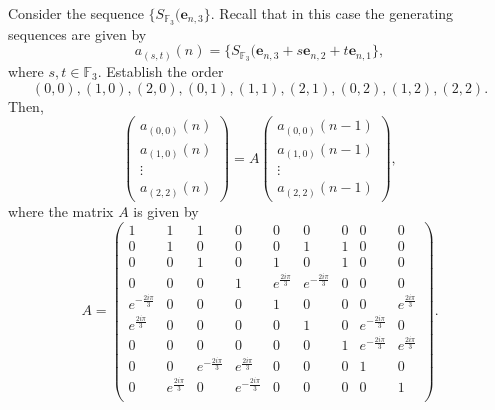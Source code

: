 \begin{example}
Consider the sequence $\{S_{\mathbb{F}_3}(\boldsymbol{e}_{n,3}\}$.  Recall that in this case the generating sequences are given by 
 \begin{equation}
  a_{(s,t)}(n)=\{S_{\mathbb{F}_3}(\boldsymbol{e}_{n,3}+s\boldsymbol{e}_{n,2}+t\boldsymbol{e}_{n,1}\},
 \end{equation}
 where $s,t\in \mathbb{F}_3$.  Establish the order
 $$(0,0), (1,0), (2,0), (0,1), (1,1), (2,1), (0,2),(1,2), (2,2).$$
 Then, 
 \begin{equation}
\left( \begin{array}{c}
  a_{(0,0)}(n)\\
  a_{(1,0)}(n)\\
  \vdots\\
  a_{(2,2)}(n)
 \end{array}
\right) = A \left( \begin{array}{c}
  a_{(0,0)}(n-1)\\
  a_{(1,0)}(n-1)\\
  \vdots\\
  a_{(2,2)}(n-1)
 \end{array}
\right),
\end{equation}
where the matrix $A$ is given by
\begin{equation}
 A=\left(
\begin{array}{ccccccccc}
 1 & 1 & 1 & 0 & 0 & 0 & 0 & 0 & 0 \\
 0 & 1 & 0 & 0 & 0 & 1 & 1 & 0 & 0 \\
 0 & 0 & 1 & 0 & 1 & 0 & 1 & 0 & 0 \\
 0 & 0 & 0 & 1 & e^{\frac{2 i \pi }{3}} & e^{-\frac{2 i \pi }{3}} & 0 & 0 & 0 \\
 e^{-\frac{2 i \pi }{3}} & 0 & 0 & 0 & 1 & 0 & 0 & 0 & e^{\frac{2 i \pi }{3}} \\
 e^{\frac{2 i \pi }{3}} & 0 & 0 & 0 & 0 & 1 & 0 & e^{-\frac{2 i \pi }{3}} & 0 \\
 0 & 0 & 0 & 0 & 0 & 0 & 1 & e^{-\frac{2 i \pi }{3}} & e^{\frac{2 i \pi }{3}} \\
 0 & 0 & e^{-\frac{2 i \pi }{3}} & e^{\frac{2 i \pi }{3}} & 0 & 0 & 0 & 1 & 0 \\
 0 & e^{\frac{2 i \pi }{3}} & 0 & e^{-\frac{2 i \pi }{3}} & 0 & 0 & 0 & 0 & 1 \\
\end{array}
\right).
\end{equation}
\end{example}

